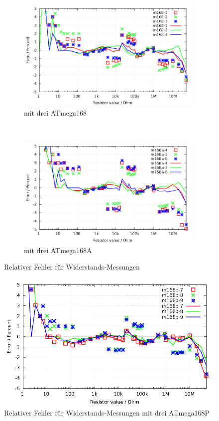\begin{figure}[H]
  \begin{subfigure}[b]{9cm}
    \centering
    \includegraphics[width=9cm]{../GNU/m168res_all.pdf}
    \caption{mit drei ATmega168}
    \label{fig:m168res_all}
  \end{subfigure}
  ~
  \begin{subfigure}[b]{9cm}
    \centering
    \includegraphics[width=9cm]{../GNU/m168ares_all.pdf}
    \caption{mit drei ATmega168A}
    \label{fig:m168ares_all}
  \end{subfigure}
\caption{Relativer Fehler für Widerstands-Messungen}
\end{figure}

\begin{figure}[H]
\centering
\includegraphics[width=16cm]{../GNU/m168pres_all.pdf}
\caption{Relativer Fehler für Widerstands-Messungen mit drei ATmega168P }
\label{fig:m168pres_all}
\end{figure}

